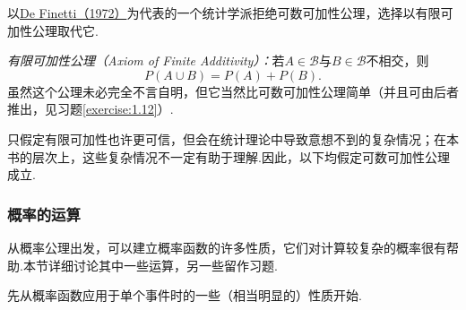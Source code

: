 以\hyperref[bib:source95]{De Finetti（1972）}为代表的一个统计学派拒绝可数可加性公理，选择以有限可加性公理取代它.

\noindent\emph{有限可加性公理（Axiom of Finite Additivity）：}若$A\in\mathscr B$与$B\in\mathscr B$不相交，则
$$P(A\cup B)=P(A)+P(B).$$
虽然这个公理未必完全不言自明，但它当然比可数可加性公理简单（并且可由后者推出，见习题\ref{exercise:1.12}）.

只假定有限可加性也许更可信，但会在统计理论中导致意想不到的复杂情况；在本书的层次上，这些复杂情况不一定有助于理解.因此，以下均假定可数可加性公理成立.

\subsubsection{概率的运算}\label{sec:1.2.2}
从概率公理出发，可以建立概率函数的许多性质，它们对计算较复杂的概率很有帮助.本节详细讨论其中一些运算，另一些留作习题.

先从概率函数应用于单个事件时的一些（相当明显的）性质开始.


